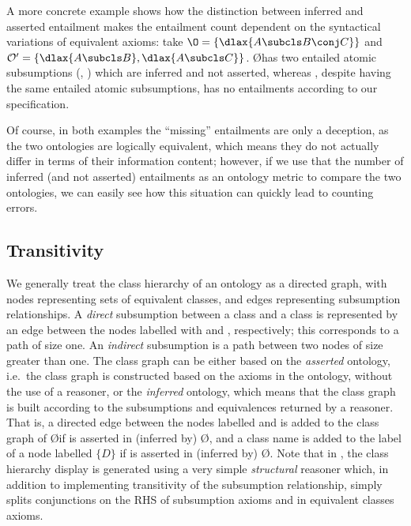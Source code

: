 A more concrete example shows how the distinction between inferred and asserted entailment makes the entailment count dependent on the syntactical variations of equivalent axioms: take $\O = \{\dlax{A \subcls B \conj C}\}$ and $\oprime = \{\dlax{A \subcls B}, \dlax{A \subcls C}\}$. \O has two entailed atomic subsumptions (, ) which are inferred and not asserted, whereas \oprime, despite having the same entailed atomic subsumptions, has no entailments according to our specification.

Of course, in both examples the \enquote{missing} entailments are only a deception, as the two ontologies are logically equivalent, which means they do not actually differ in terms of their information content; however, if we use that the number of inferred (and not asserted) entailments as an ontology metric to compare the two ontologies, we can easily see how this situation can quickly lead to counting errors.


\subsection{Transitivity}

We generally treat the class hierarchy of an ontology as a directed graph, with nodes representing sets of equivalent classes, and edges representing subsumption relationships. A \emph{direct} subsumption between a class  and a class  is represented by an edge between the nodes labelled with  and , respectively; this corresponds to a path of size one. An \emph{indirect} subsumption is a path between two nodes of size greater than one. The class graph can be either based on the \emph{asserted} ontology, i.e.\ the class graph is constructed based on the axioms in the ontology, without the use of a reasoner, or the \emph{inferred} ontology, which means that the class graph is built according to the subsumptions and equivalences returned by a reasoner. That is, a directed edge between the nodes labelled  and  is added to the class graph of \O if  is asserted in (inferred by) \O, and a class name  is added to the label of a node labelled $\{D\}$ if  is asserted in (inferred by) \O. Note that in \protege, the class hierarchy display is generated using a very simple \emph{structural} reasoner which, in addition to implementing transitivity of the subsumption relationship, simply splits conjunctions on the RHS of subsumption axioms and in equivalent classes axioms.

